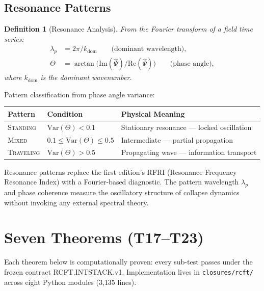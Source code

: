 \documentclass[
  aps,
  prd,
  preprint,
  superscriptaddress,
  nofootinbib,
  floatfix,
  longbibliography
]{revtex4-2}
\newtheorem{definition}[theorem]{Definition}
\newcommand{\regime}[1]{\textrm{\upshape\scshape#1}}
\newcommand{\Psifield}{\Psi}
\begin{document}
\subsection{Resonance Patterns}

\begin{definition}[Resonance Analysis]\label{def:resonance}
From the Fourier transform of a field time series:
\begin{align}
  \lambda_p &= 2\pi / k_{\mathrm{dom}}
    \qquad\text{(dominant wavelength)}, \nonumber\\
  \Theta &= \arctan\!\bigl(
    \mathrm{Im}(\hat{\Psifield}) /
    \mathrm{Re}(\hat{\Psifield})\bigr)
    \qquad\text{(phase angle)},
\end{align}
where $k_{\mathrm{dom}}$ is the dominant wavenumber.
\end{definition}

Pattern classification from phase angle variance:

\begin{center}
\begin{tabular}{@{}lll@{}}
\toprule
\textbf{Pattern} & \textbf{Condition} &
  \textbf{Physical Meaning} \\
\midrule
\regime{Standing}  & $\mathrm{Var}(\Theta) < 0.1$ &
  Stationary resonance — locked oscillation \\
\regime{Mixed}     & $0.1 \leq \mathrm{Var}(\Theta) \leq 0.5$ &
  Intermediate — partial propagation \\
\regime{Traveling} & $\mathrm{Var}(\Theta) > 0.5$ &
  Propagating wave — information transport \\
\bottomrule
\end{tabular}
\end{center}

Resonance patterns replace the first edition's RFRI
(Resonance Frequency Resonance Index) with a Fourier-based
diagnostic.
The pattern wavelength $\lambda_p$ and phase coherence
measure the oscillatory structure of collapse dynamics
without invoking any external spectral theory.

\section{Seven Theorems (T17–T23)}\label{sec:theorems}

Each theorem below is computationally proven: every sub-test
passes under the frozen contract RCFT.INTSTACK.v1.
Implementation lives in \texttt{closures/rcft/} across
eight Python modules (3{,}135 lines).
\end{document}

